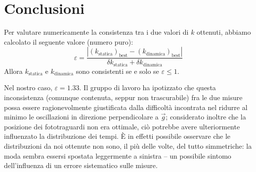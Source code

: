 \documentclass{article}
\begin{document}
\section{Conclusioni}
Per valutare numericamente la consistenza tra i due valori di $k$ ottenuti,
abbiamo calcolato il seguente valore (numero puro):
\[
    \varepsilon =
    \frac{
        \left|\left(k_\text{statica}\right)_\text{best} - \left(k_\text{dinamica}\right)_\text{best}\right|
    }{
        \delta k_\text{statica} + \delta k_\text{dinamica}
    }
\]
Allora $k_\text{statica}$ e $k_\text{dinamica}$ sono consistenti se e solo se $\varepsilon \le 1$.

Nel nostro caso, $\varepsilon = 1.33$. Il gruppo di lavoro ha ipotizzato che
questa inconsistenza (comunque contenuta, seppur non trascurabile) fra le due
misure possa essere ragionevolmente giustificata dalla difficoltà incontrata
nel ridurre al minimo le oscillazioni in direzione perpendicolare a $\vec{g}$;
considerato inoltre che la posizione dei fototraguardi non era ottimale, ciò
potrebbe avere ulteriormente influenzato la distribuzione dei tempi. È in
effetti possibile osservare che le distribuzioni da noi ottenute non sono,
il più delle volte, del tutto simmetriche: la moda sembra essersi spostata
leggermente a sinistra – un possibile sintomo dell'influenza di un
errore sistematico sulle misure.
\end{document}

